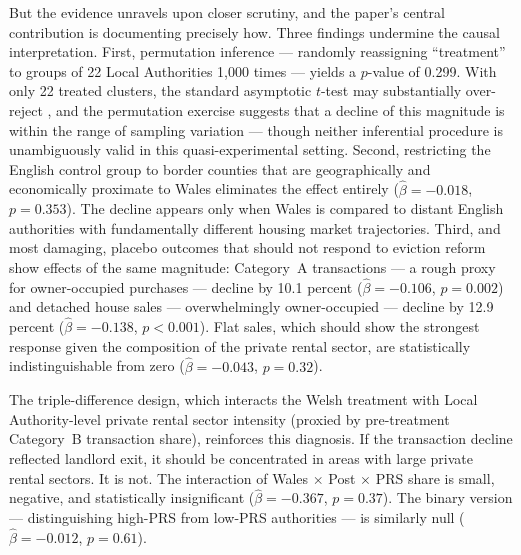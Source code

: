 \documentclass[12pt]{article}
\begin{document}
But the evidence unravels upon closer scrutiny, and the paper's central contribution is documenting precisely how. Three findings undermine the causal interpretation. First, permutation inference --- randomly reassigning ``treatment'' to groups of 22 Local Authorities 1,000 times --- yields a $p$-value of 0.299. With only 22 treated clusters, the standard asymptotic $t$-test may substantially over-reject \citep{conley2011inference, mackinnon2022cluster}, and the permutation exercise suggests that a decline of this magnitude is within the range of sampling variation --- though neither inferential procedure is unambiguously valid in this quasi-experimental setting. Second, restricting the English control group to border counties that are geographically and economically proximate to Wales eliminates the effect entirely ($\hat{\beta} = -0.018$, $p = 0.353$). The decline appears only when Wales is compared to distant English authorities with fundamentally different housing market trajectories. Third, and most damaging, placebo outcomes that should not respond to eviction reform show effects of the same magnitude: Category~A transactions --- a rough proxy for owner-occupied purchases --- decline by 10.1 percent ($\hat{\beta} = -0.106$, $p = 0.002$) and detached house sales --- overwhelmingly owner-occupied --- decline by 12.9 percent ($\hat{\beta} = -0.138$, $p < 0.001$). Flat sales, which should show the strongest response given the composition of the private rental sector, are statistically indistinguishable from zero ($\hat{\beta} = -0.043$, $p = 0.32$).

The triple-difference design, which interacts the Welsh treatment with Local Authority-level private rental sector intensity (proxied by pre-treatment Category~B transaction share), reinforces this diagnosis. If the transaction decline reflected landlord exit, it should be concentrated in areas with large private rental sectors. It is not. The interaction of Wales $\times$ Post $\times$ PRS share is small, negative, and statistically insignificant ($\hat{\beta} = -0.367$, $p = 0.37$). The binary version --- distinguishing high-PRS from low-PRS authorities --- is similarly null ($\hat{\beta} = -0.012$, $p = 0.61$).
\end{document}
